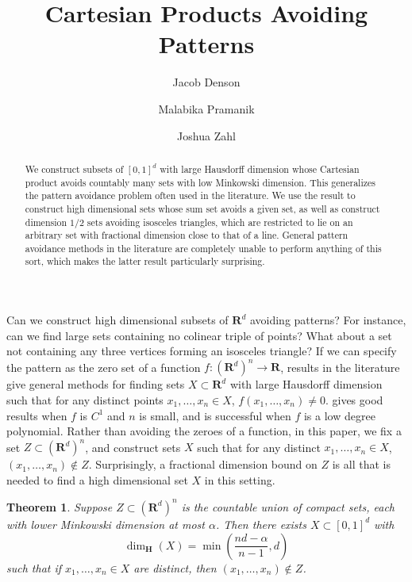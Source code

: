 \documentclass[dvipsnames]{article}
\title{Cartesian Products Avoiding Patterns}
\author{Jacob Denson\\ \and Malabika Pramanik\\ \and Joshua Zahl}
\theoremstyle{plain}
\theoremstyle{plain}
\newtheorem{theorem}{Theorem}
\begin{document}
\maketitle










\begin{abstract}
	We construct subsets of $[0,1]^d$ with large Hausdorff dimension whose Cartesian product avoids countably many sets with low Minkowski dimension. This generalizes the pattern avoidance problem often used in the literature. We use the result to construct high dimensional sets whose sum set avoids a given set, as well as construct dimension $1/2$ sets avoiding isosceles triangles, which are restricted to lie on an arbitrary set with fractional dimension close to that of a line. General pattern avoidance methods in the literature are completely unable to perform anything of this sort, which makes the latter result particularly surprising.
\end{abstract}










Can we construct high dimensional subsets of $\mathbf{R}^d$ avoiding patterns? For instance, can we find large sets containing no colinear triple of points? What about a set not containing any three vertices forming an isosceles triangle? If we can specify the pattern as the zero set of a function $f: (\mathbf{R}^d)^n \to \mathbf{R}$, results in the literature give general methods for finding sets $X \subset \mathbf{R}^d$ with large Hausdorff dimension such that for any distinct points $x_1, \dots, x_n \in X$, $f(x_1, \dots, x_n) \neq 0$. \cite{MalabikaRob} gives good results when $f$ is $C^1$ and $n$ is small, and \cite{Mathe} is successful when $f$ is a low degree polynomial. Rather than avoiding the zeroes of a function, in this paper, we fix a set $Z \subset (\mathbf{R}^d)^n$, and construct sets $X$ such that for any distinct $x_1, \dots, x_n \in X$, $(x_1, \dots, x_n) \not \in Z$. Surprisingly, a fractional dimension bound on $Z$ is all that is needed to find a high dimensional set $X$ in this setting.

\begin{theorem}
	Suppose $Z \subset (\mathbf{R}^d)^n$ is the countable union of compact sets, each with lower Minkowski dimension at most $\alpha$. Then there exists $X \subset [0,1]^d$ with
	\[ \dim_{\mathbf{H}}(X) = \min \left( \frac{nd - \alpha}{n-1}, d \right) \]
	such that if $x_1, \dots, x_n \in X$ are distinct, then $(x_1, \dots, x_n) \not \in Z$.
\end{theorem}
\end{document}
